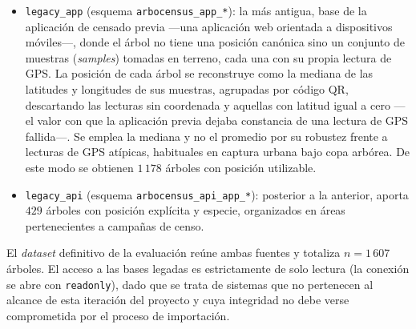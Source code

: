 \begin{itemize}
  \item \texttt{legacy\_app} (esquema \texttt{arbocensus\_app\_*}): la más antigua, base
        de la aplicación de censado previa ---una aplicación web orientada a dispositivos
        móviles---, donde el árbol no tiene una posición canónica sino
        un conjunto de muestras (\textit{samples}) tomadas en terreno, cada una con
        su propia lectura de GPS. La posición de cada árbol se reconstruye como la
        mediana de las latitudes y longitudes de sus muestras, agrupadas por
        código QR, descartando las lecturas sin coordenada y aquellas con latitud
        igual a cero ---el valor con que la aplicación previa dejaba constancia de una
        lectura de GPS fallida---. Se emplea la
        mediana y no el promedio por su robustez frente a lecturas de GPS
        atípicas, habituales en captura urbana bajo copa arbórea. De este modo se
        obtienen $1\,178$ árboles con posición utilizable.
  \item \texttt{legacy\_api} (esquema \texttt{arbocensus\_api\_app\_*}): posterior a la
        anterior, aporta $429$ árboles con posición explícita y especie, organizados en
        áreas pertenecientes a campañas de censo.
\end{itemize}

El \textit{dataset} definitivo de la evaluación reúne ambas fuentes y totaliza
$n = 1\,607$ árboles. El acceso a las bases legadas es estrictamente de solo
lectura (la conexión se abre con \texttt{readonly}), dado que se trata de sistemas
que no pertenecen al alcance de esta iteración del proyecto y cuya integridad no debe verse
comprometida por el proceso de importación.

